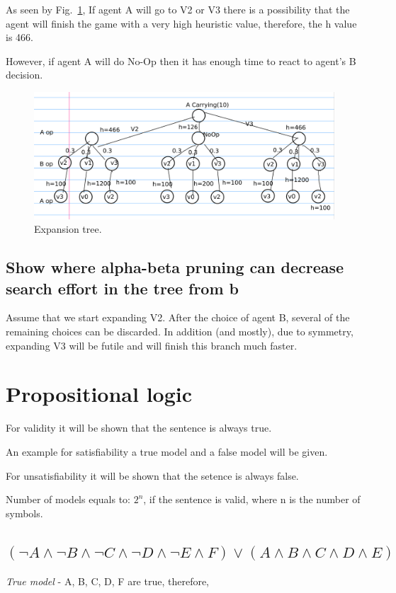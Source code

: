\documentclass{article}                     %
\newcommand{\nt}[1]{\neg #1}
\begin{document}
	As seen by Fig.~\ref{fig:q42}, If agent A will go to V2 or V3 there is a possibility that the agent will finish the game with a very high heuristic value, therefore, the h value is 466.
	
	However, if agent A will do No-Op then it has enough time to react to agent's B decision.
	\begin{figure}[H]
		\centering
		\includegraphics[width=0.9\linewidth]{q4_2.png}
		\caption{Expansion tree.}
		\label{fig:q42}
	\end{figure}
	
	\subsection{Show where alpha-beta pruning can decrease search effort in the tree from b}
	Assume that we start expanding V2. After the choice of agent B, several of the remaining choices can be discarded. In addition (and mostly), due to symmetry, expanding V3 will be futile and will finish this branch much faster.
	
	\section{Propositional logic}
	For validity it will be shown that the sentence is always true.
	
	An example for satisfiability a true model and a false model will be given.
	
	For unsatisfiability it will be shown that the setence is always false.
	
	Number of models equals to: $ 2^n $, if the sentence is valid, where n is the number of symbols.
	
	\subsection{$ (\nt{A} \land \nt{B} \land \nt{C} \land \nt{D} \land \nt{E} \land F) \lor (A \land B \land C \land D \land E)$}
	\textit{True model} - A, B, C, D, F are true, therefore,
	
\end{document}
